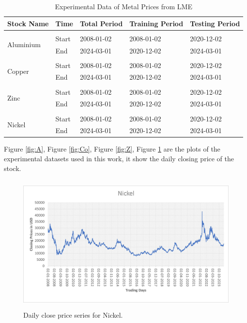 \documentclass{ws-ijait}
\begin{document}
\begin{table}[!htbp]
	\begin{center}
		\begin{tabular}{ p{1.5cm}p{1cm}p{2cm}p{2cm}p{2cm}  } \hline
			
			Stock Name &Time &Total Period &Training Period &Testing Period\\ \hline \hline \\
			\multirow{2}{*}{Aluminium}&Start & 2008-01-02  &2008-01-02  &2020-12-02 \\
			&End & 2024-03-01 &2020-12-02 &2024-03-01\\ \hline\\
			\multirow{2}{*}{Copper}&Start & 2008-01-02  &2008-01-02  &2020-12-02 \\
			&End & 2024-03-01 &2020-12-02 &2024-03-01\\ \hline\\
			\multirow{2}{*}{Zinc}&Start & 2008-01-02  &2008-01-02  &2020-12-02 \\
			&End & 2024-03-01 &2020-12-02 &2024-03-01\\ \hline\\
			\multirow{2}{*}{Nickel}&Start & 2008-01-02  &2008-01-02  &2020-12-02 \\
			&End & 2024-03-01 &2020-12-02 &2024-03-01\\ \hline \hline
		\end{tabular}
		\caption{Experimental Data of Metal Prices from LME} \label{tab1}
	\end{center}
\end{table}
Figure \ref{fig:A}, Figure \ref{fig:Co}, Figure \ref{fig:Z}, Figure \ref{fig:N} are the plots of the experimental datasets used in this work, it show the daily closing price of the stock.
\begin{center}
	\begin{figure}[!htbp]
		\centering
		\includegraphics[width=13cm, height=7cm]{N.png}
		\caption{Daily close price series for Nickel.}
		\label{fig:N}
	\end{figure}
\end{center}
\end{document}
